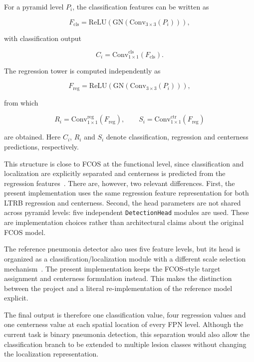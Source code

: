\documentclass[11pt,a4paper]{article}
\begin{document}
For a pyramid level $P_i$, the classification features can be written as

\begin{equation}
F_{\mathrm{cls}}=
\mathrm{ReLU}\left(\mathrm{GN}\left(\mathrm{Conv}_{3\times3}(P_i)\right)\right),
\end{equation}

with classification output

\begin{equation}
C_i=\mathrm{Conv}_{1\times1}^{\mathrm{cls}}(F_{\mathrm{cls}}).
\end{equation}

The regression tower is computed independently as

\begin{equation}
F_{\mathrm{reg}}=
\mathrm{ReLU}\left(\mathrm{GN}\left(\mathrm{Conv}_{3\times3}(P_i)\right)\right),
\end{equation}

from which

\begin{equation}
R_i=\mathrm{Conv}_{1\times1}^{\mathrm{reg}}(F_{\mathrm{reg}}),
\qquad
S_i=\mathrm{Conv}_{1\times1}^{\mathrm{ctr}}(F_{\mathrm{reg}})
\end{equation}

are obtained. Here $C_i$, $R_i$ and $S_i$ denote classification,
regression and centerness predictions, respectively.

This structure is close to FCOS at the functional level, since classification
and localization are explicitly separated and centerness is predicted from
the regression features~\cite{tian2019fcos}. There are, however, two relevant
differences. First, the present implementation uses the same regression
feature representation for both LTRB regression and centerness. Second, the
head parameters are not shared across pyramid levels: five independent
\texttt{DetectionHead} modules are used. These are implementation choices
rather than architectural claims about the original FCOS model.

The reference pneumonia detector also uses five feature levels, but its head
is organized as a classification/localization module with a different scale
selection mechanism~\cite{wu2024pneumonia}. The present implementation keeps
the FCOS-style target assignment and centerness formulation instead. This
makes the distinction between the project and a literal re-implementation of
the reference model explicit.

The final output is therefore one classification value, four regression
values and one centerness value at each spatial location of every FPN level.
Although the current task is binary pneumonia detection, this separation
would also allow the classification branch to be extended to multiple lesion
classes without changing the localization representation.
\end{document}
